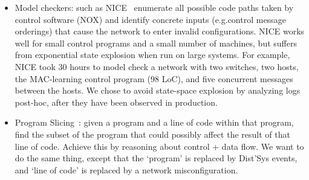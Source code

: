 \begin{itemize}
\item Model checkers: such as NICE~\cite{nice} enumerate all possible code paths taken by control software (NOX)
and identify concrete inputs (e.g.control message orderings) that cause
the network to enter invalid configurations. NICE works well for small
control programs and a small number of machines, but suffers from exponential
state explosion when run on large systems. For example, NICE took 30 hours to
model check a network with two switches, two hosts, the MAC-learning
control program (98 LoC), and five concurrent
messages between the hosts. We chose to avoid state-space explosion by analyzing logs post-hoc, after they have been observed in production.
\item Program Slicing~\cite{weiser1981program}: given a program and a line of code
within that program, find the subset of the program that could possibly affect
the result of that line of code. Achieve this by reasoning about control +
data flow. We want to do the same thing, except that the `program' is replaced
by Dist'Sys events, and `line of code' is replaced by a network misconfiguration.
\end{itemize}


